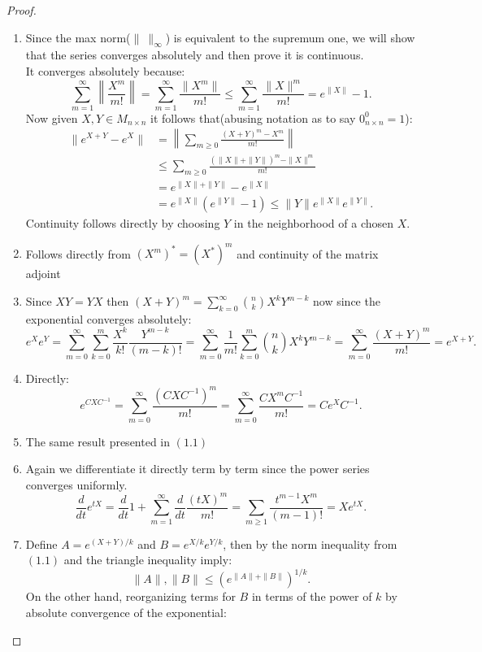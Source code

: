 \begin{proof}
	\begin{enumerate}[label=(\alph*)]
		\item Since the max norm($\|\ \|_\infty$) is equivalent to the supremum one, we will show that the series converges absolutely and then prove it is continuous.\\
		It converges absolutely because:
		\begin{equation}
			\sum_{m=1}^\infty \left\|\frac{X^m}{m!}\right\| = \sum_{m=1}^\infty \frac{\|X^m\|}{m!} \le \sum_{m=1}^\infty \frac{\|X\|^m}{m!} = e^{\|X\|}-1.	
		\end{equation}
		Now given $X,Y \in M_{n\times n}$ it follows that(abusing notation as to say $0_{n\times n}^0=1$):
		\begin{align*}
		\|e^{X+Y}-e^X\| &=\left\|\sum_{m\ge 0}\frac{(X+Y)^m - X^m}{m!}\right\|\\
		&\le \sum_{m\ge 0} \frac{(\|X\|+\|Y\|)^m - \|X\|^m}{m!}\\
		&= e^{\|X\|+\|Y\|}-e^{\|X\|}\\
		&= e^{\|X\|} (e^{\|Y\|}-1) \le \|Y\|e^{\|X\|}e^{\|Y\|}.
		\end{align*}
		Continuity follows directly by choosing $Y$ in the neighborhood of a chosen $X$.
		\item Follows directly from $(X^m)^*=(X^*)^m$ and continuity of the matrix adjoint
		\item Since $XY=YX$ then $(X+Y)^m=\sum_{k=0}^\infty {n\choose k}X^kY^{m-k}$ now since the exponential converges absolutely:
		$$e^Xe^Y = \sum_{m=0}^\infty\sum_{k=0}^m \frac{X^k}{k!}\frac{Y^{m-k}}{(m-k)!}=\sum_{m=0}^\infty \frac{1}{m!}\sum_{k=0}^m{n\choose k}X^kY^{m-k} = \sum_{m=0}^\infty \frac{(X+Y)^m}{m!} = e^{X+Y}.$$
		\item Directly:
		$$e^{CXC^{-1}} = \sum_{m=0}^\infty \frac{(CXC^{-1})^m}{m!} = \sum_{m=0}^\infty \frac{CX^mC^{-1}}{m!} = C e^X C^{-1}.$$
		\item The same result presented in $(1.1)$
		\item Again we differentiate it directly term by term since the power series converges uniformly.
		$$\frac{d}{dt} e^{tX} = \frac{d}{dt}1+\sum_{m=1}^\infty \frac{d}{dt}\frac{(tX)^m}{m!} = \sum_{m\ge 1} \frac{t^{m-1}X^m}{(m-1)!} = Xe^{tX}.  $$
		\item Define $A= e^{(X+Y)/k}$ and $B=e^{X/k}e^{Y/k}$, then by the norm inequality from $(1.1)$ and the triangle inequality imply:
		$$\|A\|,\|B\|\le (e^{\|A\|+\|B\|})^{1/k}.$$
		On the other hand, reorganizing terms for $B$ in terms of the power of $k$ by absolute convergence of the exponential:

\end{enumerate}
\end{proof}
